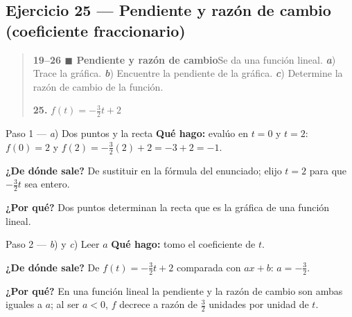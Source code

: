 \documentclass[11pt]{article}
\begin{document}
\subsection*{Ejercicio 25 — Pendiente y razón de cambio (coeficiente fraccionario)}

\begin{quote}
\textbf{19--26 $\blacksquare$ Pendiente y razón de cambio}\quad Se da una función lineal. \textbf{\textit{a}}) Trace la gráfica. \textbf{\textit{b}}) Encuentre la pendiente de la gráfica. \textbf{\textit{c}}) Determine la razón de cambio de la función.

\textbf{25.} $f(t)=-\tfrac{3}{2}t+2$
\end{quote}

\begin{paso}{Paso 1 --- \textit{a}) Dos puntos y la recta}
\textbf{Qué hago:} evalúo en $t=0$ y $t=2$: $f(0)=2$ y $f(2)=-\tfrac32(2)+2=-3+2=-1$.

\textbf{¿De dónde sale?} De sustituir en la fórmula del enunciado; elijo $t=2$ para que $-\tfrac32 t$ sea entero.

\textbf{¿Por qué?} Dos puntos determinan la recta que es la gráfica de una función lineal.
\begin{center}
\end{center}
\end{paso}

\begin{paso}{Paso 2 --- \textit{b}) y \textit{c}) Leer $a$}
\textbf{Qué hago:} tomo el coeficiente de $t$.

\textbf{¿De dónde sale?} De $f(t)=-\tfrac32 t+2$ comparada con $ax+b$: $a=-\tfrac32$.

\textbf{¿Por qué?} En una función lineal la pendiente y la razón de cambio son ambas iguales a $a$; al ser $a<0$, $f$ decrece a razón de $\tfrac32$ unidades por unidad de $t$.
\end{paso}
\end{document}
